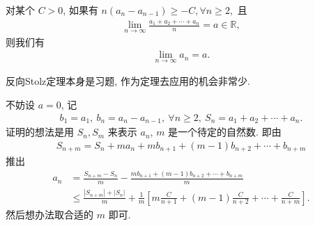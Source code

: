 \documentclass[../../main.tex]{subfiles}
\begin{document}
\begin{theorem}\label{theorem:反向Stolz定理}
对某个 $C > 0$, 如果有 $n(a_n - a_{n-1}) \geqslant -C, \forall n \geqslant 2,$ 且
\begin{align*}
\lim_{n \to \infty} \frac{a_1 + a_2 + \cdots + a_n}{n} = a \in \mathbb{R},
\end{align*}
则我们有
\begin{align*}
\lim_{n \to \infty} a_n = a.
\end{align*}
\end{theorem}
\begin{note}
反向Stolz定理本身是习题, 作为定理去应用的机会非常少.
\end{note}
\begin{note}
不妨设 $a = 0$, 记
\begin{align*}
b_1 = a_1,\ b_n = a_n - a_{n-1},\ \forall n \geqslant 2,\ S_n = a_1 + a_2 + \cdots + a_n.
\end{align*}
证明的想法是用 $S_n, S_m$ 来表示 $a_n$, $m$ 是一个待定的自然数. 即由
\begin{align*}
S_{n+m} = S_n + m a_n + m b_{n+1} + (m - 1) b_{n+2} + \cdots + b_{n+m}
\end{align*}
推出
\begin{align*}
a_n &= \frac{S_{n+m} - S_n}{m} - \frac{m b_{n+1} + (m - 1) b_{n+2} + \cdots + b_{n+m}}{m} \\
&\leqslant \frac{|S_{n+m}| + |S_n|}{m} + \frac{1}{m} \left[ m \frac{C}{n + 1} + (m - 1) \frac{C}{n + 2} + \cdots + \frac{C}{n + m} \right].
\end{align*}
然后想办法取合适的 $m$ 即可.
\end{note}
\end{document}
